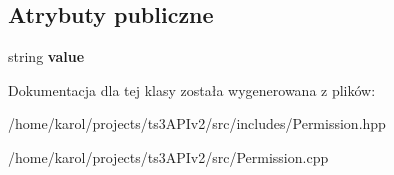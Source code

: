 \subsection*{Atrybuty publiczne}
\begin{DoxyCompactItemize}
\item 
string {\bfseries value}\hypertarget{class_ts3_api_1_1_permission_ae096a38d2f9bb6850ddca16d5d71f71c}{}\label{class_ts3_api_1_1_permission_ae096a38d2f9bb6850ddca16d5d71f71c}

\end{DoxyCompactItemize}


Dokumentacja dla tej klasy została wygenerowana z plików\+:\begin{DoxyCompactItemize}
\item 
/home/karol/projects/ts3\+A\+P\+Iv2/src/includes/Permission.\+hpp\item 
/home/karol/projects/ts3\+A\+P\+Iv2/src/Permission.\+cpp\end{DoxyCompactItemize}
